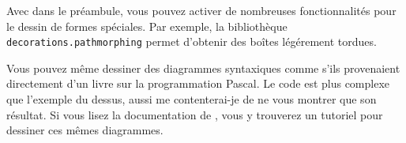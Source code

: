 Avec  dans le préambule, vous pouvez activer de nombreuses
fonctionnalités pour le dessin de formes spéciales. Par exemple, la
bibliothèque \texttt{decorations.pathmorphing} permet d'obtenir des
boîtes légérement tordues.

\begin{example}
\usetikzlibrary{%
  decorations.pathmorphing}
\end{example}

\begin{example}
\usetikzlibrary{positioning}
\end{example}

Vous pouvez même dessiner des diagrammes syntaxiques comme s'ils provenaient
directement d'un livre sur la programmation Pascal. Le code est plus
complexe que l'exemple du dessus, aussi me contenterai-je de ne vous
montrer que son résultat. Si vous lisez la documentation de , vous
y trouverez un tutoriel pour dessiner ces mêmes diagrammes.

